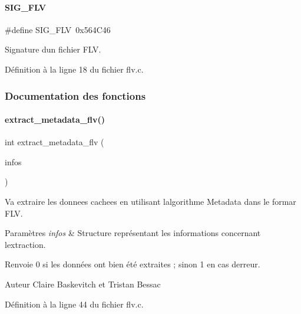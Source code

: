 \paragraph{\texorpdfstring{S\+I\+G\+\_\+\+F\+LV}{SIG\_FLV}}
{\footnotesize\ttfamily \#define S\+I\+G\+\_\+\+F\+LV~0x564\+C46}

Signature d\textquotesingle{}un fichier F\+LV. 

Définition à la ligne 18 du fichier flv.\+c.



\subsubsection{Documentation des fonctions}
\mbox{\label{a00080_ac1c7c5c1221f121e1c0014efe23b82f8}} 
\paragraph{\texorpdfstring{extract\+\_\+metadata\+\_\+flv()}{extract\_metadata\_flv()}}
{\footnotesize\ttfamily int extract\+\_\+metadata\+\_\+flv (\begin{DoxyParamCaption}\item[{\hyperlink{a00008_aa8ca908d92fb5bdd3c0a9e1f58b2cf03}{info\+\_\+s} $\ast$}]{infos }\end{DoxyParamCaption})}



Va extraire les donnees cachees en utilisant l\textquotesingle{}algorithme Metadata dans le formar F\+LV. 


\begin{DoxyParams}{Paramètres}
{\em infos} & Structure représentant les informations concernant l\textquotesingle{}extraction. \\
\hline
\end{DoxyParams}
\begin{DoxyReturn}{Renvoie}
0 si les données ont bien été extraites ; sinon 1 en cas d\textquotesingle{}erreur. 
\end{DoxyReturn}
\begin{DoxyAuthor}{Auteur}
Claire Baskevitch et Tristan Bessac 
\end{DoxyAuthor}


Définition à la ligne 44 du fichier flv.\+c.

